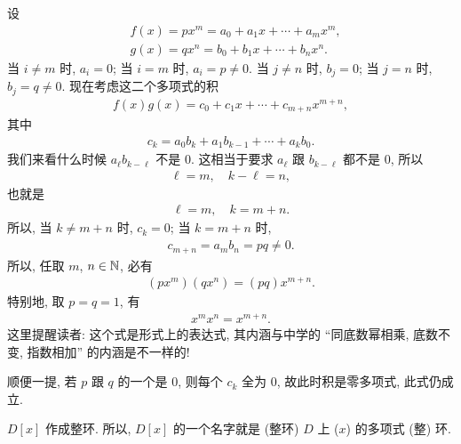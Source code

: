 \begin{remark}
    设
    \begin{align*}
         & f(x) = px^m = a_0 + a_1 x + \cdots + a_m x^m, \\
         & g(x) = qx^n = b_0 + b_1 x + \cdots + b_n x^n.
    \end{align*}
    当 $i \neq m$ 时, $a_i = 0$; 当 $i=m$ 时, $a_i = p \neq 0$. 当 $j \neq n$ 时, $b_j = 0$; 当 $j=n$ 时, $b_j = q \neq 0$. 现在考虑这二个多项式的积
    \begin{align*}
        f(x)g(x) = c_0 + c_1 x + \cdots + c_{m+n} x^{m+n},
    \end{align*}
    其中
    \begin{align*}
        c_k = a_0 b_k + a_1 b_{k-1} + \cdots + a_k b_0.
    \end{align*}
    我们来看什么时候 $a_\ell b_{k - \ell}$ 不是 $0$. 这相当于要求 $a_\ell$ 跟 $b_{k - \ell}$ 都不是 $0$, 所以
    \begin{align*}
        \ell = m, \quad k - \ell = n,
    \end{align*}
    也就是
    \begin{align*}
        \ell = m, \quad k = m + n.
    \end{align*}
    所以, 当 $k \neq m+n$ 时, $c_k = 0$; 当 $k = m+n$ 时,
    \begin{align*}
        c_{m+n} = a_m b_n = pq \neq 0.
    \end{align*}
    所以, 任取 $m$, $n \in \mathbb{N}$, 必有
    \begin{align*}
        (px^m) (qx^n) = (pq) x^{m+n}.
    \end{align*}
    特别地, 取 $p=q=1$, 有
    \begin{align*}
        x^m x^n = x^{m+n}.
    \end{align*}
    这里提醒读者: 这个式是形式上的表达式, 其内涵与中学的 ``同底数幂相乘, 底数不变, 指数相加'' 的内涵是不一样的!

    顺便一提, 若 $p$ 跟 $q$ 的一个是 $0$, 则每个 $c_k$ 全为 $0$, 故此时积是零多项式, 此式仍成立.
\end{remark}

\begin{proposition}
    $D[x]$ 作成整环. 所以, $D[x]$ 的一个名字就是 (整环) $D$ 上 ($x$) 的多项式 (整) 环.
\end{proposition}

